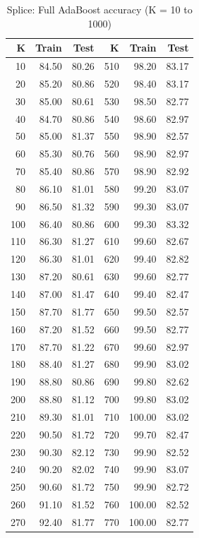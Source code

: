 \documentclass{acm_proc_article-sp}
\begin{document}
\begin{table}[H]
\centering
\caption{Splice: Full AdaBoost accuracy (K = 10 to 1000)}
\label{tab:splice-full}
{\footnotesize
\begin{tabular}{r r r | r r r}
\toprule
\textbf{K} & \textbf{Train} & \textbf{Test} & \textbf{K} & \textbf{Train} & \textbf{Test} \\
\midrule
10  & 84.50 & 80.26 & 510 & 98.20 & 83.17 \\
20  & 85.20 & 80.86 & 520 & 98.40 & 83.17 \\
30  & 85.00 & 80.61 & 530 & 98.50 & 82.77 \\
40  & 84.70 & 80.86 & 540 & 98.60 & 82.97 \\
50  & 85.00 & 81.37 & 550 & 98.90 & 82.57 \\
60  & 85.30 & 80.76 & 560 & 98.90 & 82.97 \\
70  & 85.40 & 80.86 & 570 & 98.90 & 82.92 \\
80  & 86.10 & 81.01 & 580 & 99.20 & 83.07 \\
90  & 86.50 & 81.32 & 590 & 99.30 & 83.07 \\
100 & 86.40 & 80.86 & 600 & 99.30 & 83.32 \\
110 & 86.30 & 81.27 & 610 & 99.60 & 82.67 \\
120 & 86.30 & 81.01 & 620 & 99.40 & 82.82 \\
130 & 87.20 & 80.61 & 630 & 99.60 & 82.77 \\
140 & 87.00 & 81.47 & 640 & 99.40 & 82.47 \\
150 & 87.70 & 81.77 & 650 & 99.50 & 82.57 \\
160 & 87.20 & 81.52 & 660 & 99.50 & 82.77 \\
170 & 87.70 & 81.22 & 670 & 99.60 & 82.97 \\
180 & 88.40 & 81.27 & 680 & 99.90 & 83.02 \\
190 & 88.80 & 80.86 & 690 & 99.80 & 82.62 \\
200 & 88.80 & 81.12 & 700 & 99.80 & 83.02 \\
210 & 89.30 & 81.01 & 710 & 100.00 & 83.02 \\
220 & 90.50 & 81.72 & 720 & 99.70 & 82.47 \\
230 & 90.30 & 82.12 & 730 & 99.90 & 82.52 \\
240 & 90.20 & 82.02 & 740 & 99.90 & 83.07 \\
250 & 90.60 & 81.72 & 750 & 99.90 & 82.72 \\
260 & 91.10 & 81.52 & 760 & 100.00 & 82.52 \\
270 & 92.40 & 81.77 & 770 & 100.00 & 82.77 \\

\end{tabular}}
\end{table}
\end{document}
